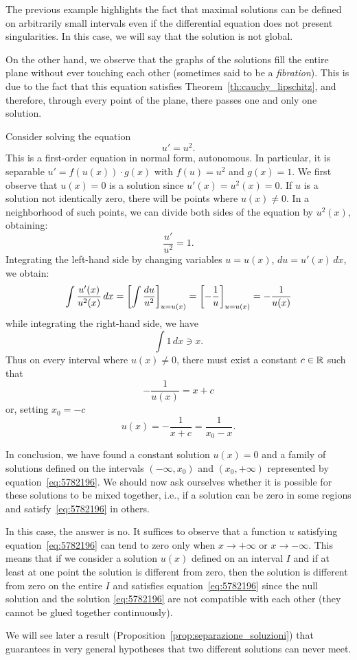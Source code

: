 \begin{remark}
The previous example highlights the fact that maximal solutions can be defined
on arbitrarily small intervals even if the differential equation does not
present singularities. In this case, we will say that the solution is not
global.

On the other hand, we observe that the graphs of the solutions fill the entire
plane without ever touching each other (sometimes said to be a
\emph{fibration}).
This is due to the fact that this equation satisfies
Theorem~\ref{th:cauchy_lipschitz}, and therefore, through every point of the
plane, there passes one and only one solution.
\end{remark}

\begin{example}
Consider solving the equation
\[
  u' = u^2.
\]
This is a first-order equation in normal form, autonomous.
In particular, it is separable
$u' = f(u(x))\cdot g(x)$
with $f(u)=u^2$ and $g(x)=1$.
We first observe that $u(x) = 0$ is a solution since $u'(x) = u^2(x) = 0$.
If $u$ is a solution not identically zero, there will be points where
$u(x)\neq 0$.
In a neighborhood of such points, we can divide both sides of the equation by
$u^2(x)$, obtaining:
\[
  \frac{u'}{u^2} = 1.
\]
Integrating the left-hand side by changing variables $u=u(x)$, $du=u'(x)\, dx$,
we obtain:
\[
  \int \frac{u'(x)}{u^2(x)}\, dx = {\left[ \int \frac{du}{u^2} \right]}_{u=u(x)} = {\left[ -\frac{1}{u} \right]}_{u=u(x)}
  = -\frac{1}{u(x)}
\]
while integrating the right-hand side, we have
\[
  \int 1 \, dx \ni x.
\]
Thus on every interval where $u(x)\neq 0$, there must exist a constant $c\in
{\mathbb R}$ such that
\[
-\frac{1}{u(x)} = x + c
\]
or, setting $x_0 = -c$
\begin{equation}\label{eq:5782196}
  u(x) = -\frac{1}{x+c} = \frac{1}{x_0-x}.
\end{equation}

In conclusion, we have found a constant solution $u(x)=0$ and a family of
solutions defined on the intervals $(-\infty,x_0)$ and $(x_0,+\infty)$
represented by equation~\eqref{eq:5782196}.
We should now ask ourselves whether it is possible for these solutions to be
mixed together, i.e., if a solution can be zero in some regions and
satisfy~\eqref{eq:5782196} in others.

In this case, the answer is no.
It suffices to observe that a function $u$ satisfying
equation~\eqref{eq:5782196} can tend to zero only when $x\to +\infty$ or $x\to
-\infty$.
This means that if we consider a solution $u(x)$ defined on an interval $I$ and
if at least at one point the solution is different from zero, then the solution
is different from zero on the entire $I$ and satisfies
equation~\eqref{eq:5782196} since the null solution and the solution
\eqref{eq:5782196} are not compatible with each other (they cannot be glued
together continuously).

We will see later a result (Proposition~\ref{prop:separazione_soluzioni}) that
guarantees in very general hypotheses that two different solutions can never
meet.
\end{example}

